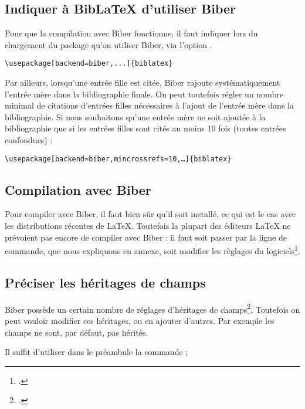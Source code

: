 \subsection{Indiquer à BibLaTeX d'utiliser Biber}

Pour que la compilation avec Biber fonctionne, il faut indiquer lors du chargement du package qu'on utiliser Biber, via l'option .

\begin{verbatim}
\usepackage[backend=biber,...]{biblatex}
\end{verbatim}

Par ailleurs, lorsqu'une entrée fille est citée, Biber rajoute systématiquement l'entrée mère dans la bibliographie finale. On peut toutefois régler un nombre minimal de citations d'entrées filles nécessaires à l'ajout de l'entrée mère dans la bibliographie. Si nous souhaitons qu'une entrée mère ne soit ajoutée à la bibliographie que si les entrées filles sont cités au moins 10 fois (toutes entrées confondues) :


\begin{verbatim}
\usepackage[backend=biber,mincrossrefs=10,…]{biblatex}
\end{verbatim}

\subsection{Compilation avec Biber}

Pour compiler avec Biber, il faut bien sûr qu'il soit installé, ce qui est le cas avec les distributions récentes de \LaTeX. Toutefois la plupart des éditeurs \LaTeX{} ne prévoient pas encore de compiler avec Biber : il faut soit passer par la ligne de commande, que nous expliquons en annexe, soit modifier les règlages du logiciels\footcite[On peut trouver comment faire pour quelques logiciels à cette adresse]{biber_logiciels}.
\subsection{Préciser les héritages de champs}

Biber possède un certain nombre de réglages d'héritages de champs\footcite{biblatex_crossrefsetup}. Toutefois on peut vouloir modifier ces héritages, ou en ajouter d'autres. Par exemple les champs  ne sont, par défaut, pas hérités. 

Il suffit d'utiliser dans le préambule la commande ;

